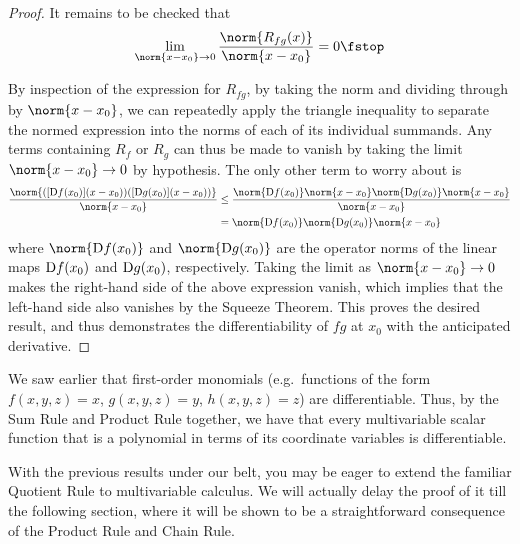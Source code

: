 \begin{proof}
  It remains to be checked that
  \[ \lim_{\norm{x-x_0}\to 0}\frac{\norm{R_{fg}(x)}}{\norm{x-x_0}}=0\fstop \]

  By inspection of the expression for \( R_{fg} \), by taking the norm and dividing through by \( \norm{x-x_0} \), we can repeatedly apply the triangle inequality to separate the normed expression into the norms of each of its individual summands. Any terms containing \( R_f \) or \( R_g \) can thus be made to vanish by taking the limit \( \norm{x-x_0}\to 0 \) by hypothesis. The only other term to worry about is
  \begin{align*}
    \frac{\norm{([\D f(x_0)](x-x_0))([\D g(x_0)](x-x_0))}}{\norm{x-x_0}}&\leq\frac{\norm{\D f(x_0)}\norm{x-x_0}\norm{\D g(x_0)}\norm{x-x_0}}{\norm{x-x_0}}\\
    &= \norm{\D f(x_0)}\norm{\D g(x_0)}\norm{x-x_0}
  \end{align*}
  where \( \norm{\D f(x_0)} \) and \( \norm{\D g(x_0)} \) are the operator norms of the linear maps \( \text{D} f(x_0) \) and \( \text{D} g(x_0) \), respectively. Taking the limit as \( \norm{x-x_0}\to 0 \) makes the right-hand side of the above expression vanish, which implies that the left-hand side also vanishes by the Squeeze Theorem. This proves the desired result, and thus demonstrates the differentiability of \( fg \) at \( x_0 \) with the anticipated derivative.
\end{proof}

We saw earlier that first-order monomials (e.g.\ functions of the form \( f(x,y,z)=x \), \( g(x,y,z)=y \), \( h(x,y,z)=z \)) are differentiable. Thus, by the Sum Rule and Product Rule together, we have that every multivariable scalar function that is a polynomial in terms of its coordinate variables is differentiable.

\vspace{3mm}

With the previous results under our belt, you may be eager to extend the familiar Quotient Rule to multivariable calculus. We will actually delay the proof of it till the following section, where it will be shown to be a straightforward consequence of the Product Rule and Chain Rule.

